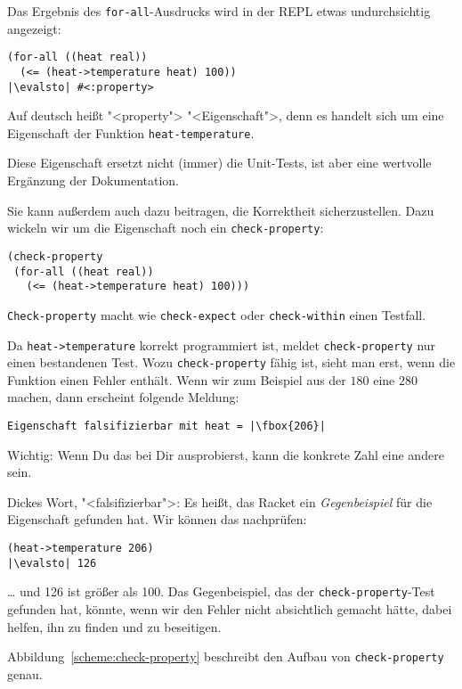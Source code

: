 Das Ergebnis des \lstinline{for-all}-Ausdrucks wird in der REPL
etwas undurchsichtig angezeigt:
%
\begin{lstlisting}
(for-all ((heat real))
  (<= (heat->temperature heat) 100))
|\evalsto| #<:property>
\end{lstlisting}
%
Auf deutsch heißt "<property"> "<Eigenschaft">, denn 
es handelt sich um eine Eigenschaft der Funktion \lstinline{heat-temperature}.  

Diese Eigenschaft ersetzt nicht (immer) die Unit-Tests, ist aber eine
wertvolle Ergänzung der Dokumentation.

Sie kann außerdem auch dazu beitragen, die Korrektheit sicherzustellen.
Dazu wickeln wir um die Eigenschaft noch ein
\lstinline{check-property}:
%
\begin{lstlisting}
(check-property
 (for-all ((heat real))
   (<= (heat->temperature heat) 100)))
\end{lstlisting}
\lstinline{Check-property} macht wie \lstinline{check-expect} oder
\lstinline{check-within} einen Testfall.

Da \lstinline{heat->temperature} korrekt programmiert ist, meldet
\lstinline{check-property} nur einen bestandenen Test.  Wozu
\lstinline{check-property} fähig ist, sieht man erst, wenn die
Funktion einen Fehler enthält.  Wenn wir zum Beispiel aus der $180$ eine
$280$ machen, dann erscheint folgende Meldung:
%
\begin{lstlisting}
Eigenschaft falsifizierbar mit heat = |\fbox{206}|
\end{lstlisting}
%
Wichtig: Wenn Du das bei Dir ausprobierst, kann die konkrete Zahl
eine andere sein.

Dickes Wort, "<falsifizierbar">: Es heißt, das
Racket ein \textit{Gegenbeispiel} für die Eigenschaft gefunden hat.
Wir können das nachprüfen:
%
\begin{lstlisting}
(heat->temperature 206)
|\evalsto| 126
\end{lstlisting}
%
\ldots{} und 126 ist größer als 100.  Das Gegenbeispiel, das der
\lstinline{check-property}-Test gefunden hat, könnte, wenn wir den
Fehler nicht absichtlich gemacht hätte, dabei helfen, ihn zu finden
und zu beseitigen.

Abbildung~\ref{scheme:check-property} beschreibt den Aufbau von
\lstinline{check-property} genau.

